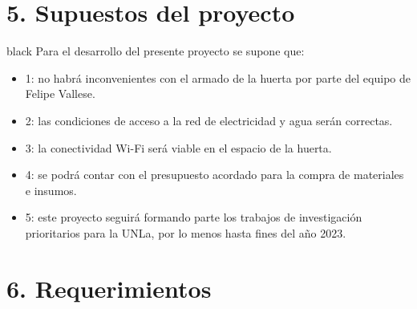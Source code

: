 \documentclass[
11pt, %
codirector, %
]{charter}
\begin{document}
\section{5. Supuestos del proyecto}
\label{sec:supuestos}

\begin{consigna}{black}
Para el desarrollo del presente proyecto se supone que:

\begin{itemize}
	\item 1: no habrá inconvenientes con el armado de la huerta por parte del equipo de Felipe Vallese.
	\item 2: las condiciones de acceso a la red de electricidad y agua serán correctas.
	\item 3: la conectividad Wi-Fi será viable en el espacio de la huerta.
	\item 4: se podrá contar con el presupuesto acordado para la compra de materiales e insumos.
	\item 5: este proyecto seguirá formando parte los trabajos de investigación prioritarios para la UNLa, por lo menos hasta fines del año 2023.
\end{itemize}
\end{consigna}

\section{6. Requerimientos}
\label{sec:requerimientos}
\end{document}
